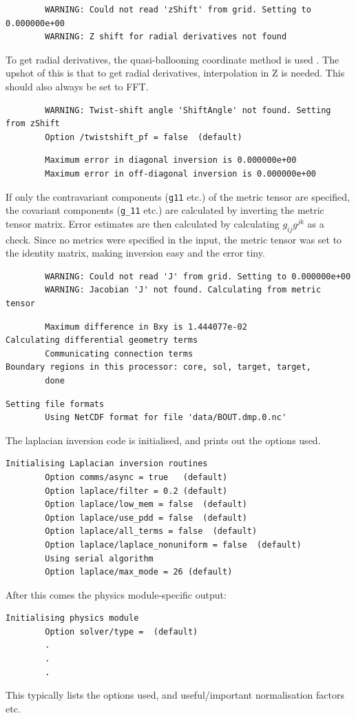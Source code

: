 \documentclass[12pt]{article}
\newcommand{\code}[1]{\texttt{#1}}
\begin{document}
%
\begin{verbatim}
        WARNING: Could not read 'zShift' from grid. Setting to 0.000000e+00
        WARNING: Z shift for radial derivatives not found
\end{verbatim}
%
To get radial derivatives, the quasi-ballooning coordinate method is used
.  The upshot of this is that to get radial derivatives, interpolation in Z is
needed. This should also always be set to FFT.

%
\begin{verbatim}
        WARNING: Twist-shift angle 'ShiftAngle' not found. Setting from zShift
        Option /twistshift_pf = false  (default)
\end{verbatim}
%
\begin{verbatim}
        Maximum error in diagonal inversion is 0.000000e+00
        Maximum error in off-diagonal inversion is 0.000000e+00
\end{verbatim}
%
If only the contravariant components (\code{g11} etc.) of the metric tensor are
specified, the covariant components (\code{g\_11} etc.) are calculated by
inverting the metric tensor matrix.  Error estimates are then calculated by
calculating $g_{ij}g^{jk}$ as a check.  Since no metrics were specified in the
input, the metric tensor was set to the identity matrix, making inversion easy
and the error tiny.
%
\begin{verbatim}
        WARNING: Could not read 'J' from grid. Setting to 0.000000e+00
        WARNING: Jacobian 'J' not found. Calculating from metric tensor
\end{verbatim}
%
\begin{verbatim}
        Maximum difference in Bxy is 1.444077e-02
Calculating differential geometry terms
        Communicating connection terms
Boundary regions in this processor: core, sol, target, target,
        done
\end{verbatim}
%
\begin{verbatim}
Setting file formats
        Using NetCDF format for file 'data/BOUT.dmp.0.nc'
\end{verbatim}
%
The laplacian inversion code is initialised, and prints out the options used.
%
\begin{verbatim}
Initialising Laplacian inversion routines
        Option comms/async = true   (default)
        Option laplace/filter = 0.2 (default)
        Option laplace/low_mem = false  (default)
        Option laplace/use_pdd = false  (default)
        Option laplace/all_terms = false  (default)
        Option laplace/laplace_nonuniform = false  (default)
        Using serial algorithm
        Option laplace/max_mode = 26 (default)
\end{verbatim}
%
After this comes the physics module-specific output:
%
\begin{verbatim}
Initialising physics module
        Option solver/type =  (default)
        .
        .
        .
\end{verbatim}
%
This typically lists the options used, and useful/important normalisation
factors etc.
\end{document}
